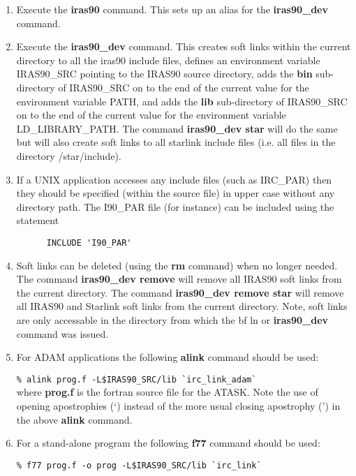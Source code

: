 \begin{enumerate}
\item Execute the {\bf iras90} command. This sets up an alias for the
{\bf iras90\_dev} command.

\item Execute the {\bf iras90\_dev} command.  This creates soft links
within the current directory to
all the iras90 include files, defines an environment variable IRAS90\_SRC
pointing to the IRAS90 source directory, adds the {\bf bin}
sub-directory of IRAS90\_SRC on to the end of the current value for the
environment variable PATH, and adds the {\bf lib} sub-directory of
IRAS90\_SRC on to the end of the current value for the environment
variable LD\_LIBRARY\_PATH. The command {\bf iras90\_dev star} will do
the same but will also create soft links to all starlink include files
(i.e. all files in the directory /star/include).

\item If a UNIX application accesses any include files (such as
IRC\_PAR) then they should be specified (within the source file) in upper case
without any directory
path. The I90\_PAR file (for instance) can be included using the statement

\verb+      INCLUDE 'I90_PAR'+\\

\item Soft links can be deleted (using the {\bf rm} command) when no longer
needed.
The command {\bf iras90\_dev remove} will remove all IRAS90 soft links from
the current directory. The command {\bf iras90\_dev remove star} will
remove all IRAS90 and Starlink soft links from the current directory.
Note, soft links are only accessable in the directory from which the {bf ln}
or {\bf iras90\_dev} command was issued.
\item For ADAM applications the following {\bf alink} command should be used:

\verb+% alink prog.f -L$IRAS90_SRC/lib `irc_link_adam`+\\

where {\bf prog.f} is the fortran source file for the ATASK.
Note the use of opening apostrophies (`) instead of the more usual closing
apostrophy (') in the above {\bf alink} command.

\item For a stand-alone program the following {\bf f77} command should be used:

\verb+% f77 prog.f -o prog -L$IRAS90_SRC/lib `irc_link`+\\
\end{enumerate}


